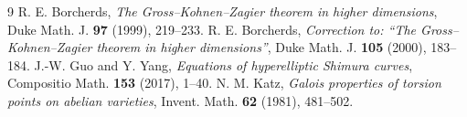 \documentclass[11pt,reqno]{amsart}
\theoremstyle{plain}
\theoremstyle{definition}
\begin{document}
\begin{thebibliography}{9}
 R. E. Borcherds, \emph{The Gross--Kohnen--Zagier theorem in higher
dimensions}, Duke Math. J. \textbf{97} (1999), 219--233.
 R. E. Borcherds, \emph{Correction to: ``The Gross--Kohnen--Zagier
theorem in higher dimensions''}, Duke Math. J. \textbf{105} (2000), 183--184.
 J.-W. Guo and Y. Yang, \emph{Equations of hyperelliptic Shimura curves},
Compositio Math. \textbf{153} (2017), 1--40.
 N. M. Katz, \emph{Galois properties of torsion points on abelian varieties},
Invent. Math. \textbf{62} (1981), 481--502.
\end{thebibliography}
\end{document}
